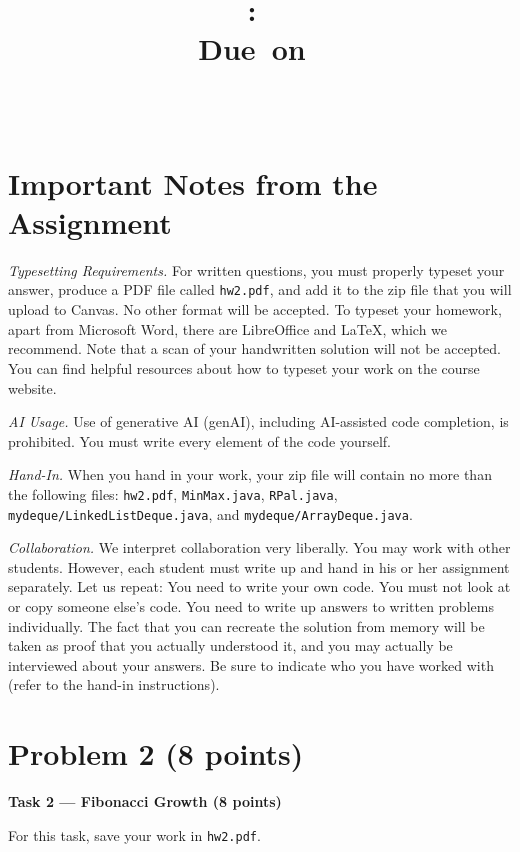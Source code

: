 \documentclass{article}
\title{
      \vspace{2in}
      \textmd{\textbf{\hmwkClass:\ \hmwkTitle}}\\
      \normalsize\vspace{0.1in}\small{Due\ on\ \hmwkDueDate}\\
      \vspace{0.1in}\large{\textit{\hmwkClassInstructor\ \hmwkClassTime}}
      \vspace{3in}
  }
\author{\hmwkAuthorName}
\date{}
\theoremstyle{remark}
\begin{document}
  \maketitle
  \newpage

  \section*{Important Notes from the Assignment}

  \textit{Typesetting Requirements.} For written questions, you must properly typeset your answer,
  produce a PDF file called \texttt{hw2.pdf}, and add it to the zip file that you will upload to Canvas. No
  other format will be accepted. To typeset your homework, apart from Microsoft Word, there are
  LibreOffice and \LaTeX, which we recommend. Note that a scan of your handwritten solution will not be
  accepted. You can find helpful resources about how to typeset your work on the course website.

  \textit{AI Usage.} Use of generative AI (genAI), including AI-assisted code completion, is prohibited.
  You must write every element of the code yourself.

  \textit{Hand-In.} When you hand in your work, your zip file will contain no more than the following
  files: \texttt{hw2.pdf}, \texttt{MinMax.java}, \texttt{RPal.java}, \texttt{mydeque/LinkedListDeque.java},
  and \texttt{mydeque/ArrayDeque.java}.

  \textit{Collaboration.} We interpret collaboration very liberally. You may work with other students.
  However, each student must write up and hand in his or her assignment separately. Let us repeat: You
  need to write your own code. You must not look at or copy someone else's code. You need to write up
  answers to written problems individually. The fact that you can recreate the solution from memory will
  be taken as proof that you actually understood it, and you may actually be interviewed about your
  answers. Be sure to indicate who you have worked with (refer to the hand-in instructions).

  \newpage

  \section*{Problem 2 (8 points)}

  \textbf{Task 2 --- Fibonacci Growth (8 points)}

  For this task, save your work in \texttt{hw2.pdf}.
\end{document}
